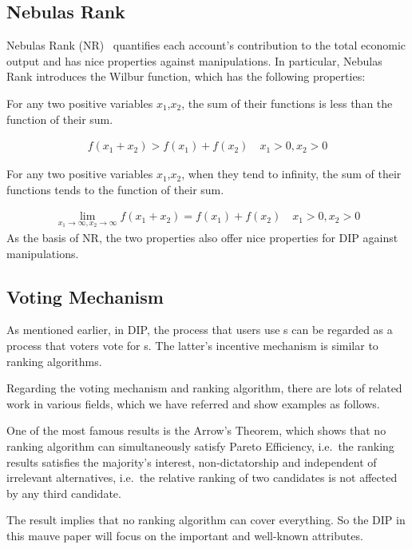\subsection{Nebulas Rank}
Nebulas Rank (NR)~\cite{Nebulasyellowpaper} quantifies each account's contribution to the total economic output and has nice properties against manipulations. In particular, Nebulas Rank introduces the Wilbur function, which has the following properties:

\begin{property}
	\label{prop:one}
	For any two positive variables $x_1$,$x_2$, the sum of their functions is less than the function of their sum.
\end{property}
\begin{align}
	f(x_1+x_2)>f(x_1)+f(x_2) \quad x_1>0,x_2>0
\end{align}
\begin{property}
	\label{prop:two}
	For any two positive variables $x_1$,$x_2$, when they tend to infinity, the sum of their functions tends to the function of their sum.
\end{property}

\begin{align}
	\lim\limits_{x_1 \to \infty, x_2\to \infty} f(x_1+x_2) = f(x_1) + f(x_2)\quad x_1>0, x_2>0
\end{align}
\noindent As the basis of NR, the two properties also offer nice properties for DIP against manipulations.

\subsection{Voting Mechanism}
As mentioned earlier, in DIP, the process that users use {\dapp}s can be
regarded as a process that voters vote for {\dapp}s. The latter's incentive mechanism is similar to ranking algorithms.

Regarding the voting mechanism and ranking algorithm, there are lots of related work in various fields, which we have referred and show examples as follows.

One of the most famous results is the Arrow's Theorem, which shows that no
ranking algorithm can simultaneously satisfy Pareto Efficiency, i.e.\, the
ranking results satisfies the majority's interest, non-dictatorship and
independent of irrelevant alternatives, i.e.\ the relative ranking of two candidates is not affected by any third candidate.

The result implies that no ranking algorithm can cover everything. So the DIP
in this mauve paper will focus on the important and well-known attributes.

